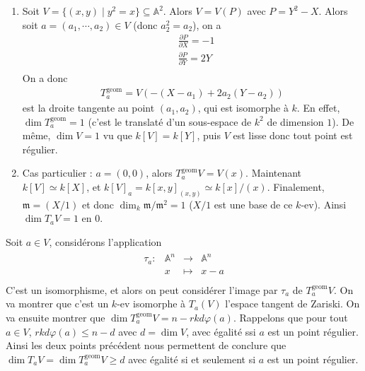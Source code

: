             \begin{expl}
                \begin{enumerate}
                    \item Soit $V = \{(x,y) \mid y^2 = x\} \subseteq \mathbb{A}^2$. Alors $V = V(P)$ avec $P = Y^2 - X$. Alors soit $a = (a_1, \cdots, a_2) \in V$ (donc $a_2^2 = a_2$), on a 
                    \begin{align*}
                        &\frac{\partial P}{\partial X} = -1 \\
                        &\frac{\partial P}{\partial Y} = 2Y \\
                    \end{align*}
                    On a donc 
                    \begin{align*}
                        T_a^\mathrm{geom} = V(-(X - a_1) + 2a_2(Y - a_2))
                    \end{align*}
                    est la droite tangente au point $(a_1, a_2)$, qui est isomorphe à $k$. En effet, $\dim T_a^\mathrm{geom} = 1$ (c'est le translaté d'un sous-espace de $k^2$ de dimension $1$). De même, $\dim V = 1$ vu que $k[V] = k[Y]$, puis $V$ est lisse donc tout point est régulier.
                    \item Cas particulier : $a = (0,0)$, alors $T_a^\mathrm{geom} V = V(x)$. Maintenant $k[V] \simeq k[X]$, et $k[V]_a = k[x,y]_{(x,y)} \simeq k[x]/(x)$. Finalement, $\mathfrak{m} = (X/1)$ et donc $\dim_k \mathfrak{m}/\mathfrak{m}^2 = 1$ ($X/1$ est une base de ce $k$-ev). Ainsi $\dim T_aV = 1$ en $0$.
                \end{enumerate}
            \end{expl}
            Soit $a \in V$, considérons l'application
            \begin{align*}
                \begin{array}{cccc}
                    \tau_a : & \mathbb{A}^n & \to & \mathbb{A}^n \\
                    & x & \mapsto & x - a \\
                \end{array}
            \end{align*}
            C'est un isomorphisme, et alors on peut considérer l'image par $\tau_a$ de $T_a^\mathrm{geom}V$. On va montrer que c'est un $k$-ev isomorphe à $T_a(V)$ l'espace tangent de Zariski. On va ensuite montrer que $\dim T_a^\mathrm{geom}V = n - rk d\varphi(a)$. Rappelons que pour tout $a \in V$, $rk d\varphi(a) \leq n-d$ avec $d = \dim V$, avec égalité ssi $a$ est un point régulier. Ainsi les deux points précédent nous permettent de conclure que $\dim T_aV = \dim T_a^\mathrm{geom}V \geq d$ avec égalité si et seulement si $a$ est un point régulier.
